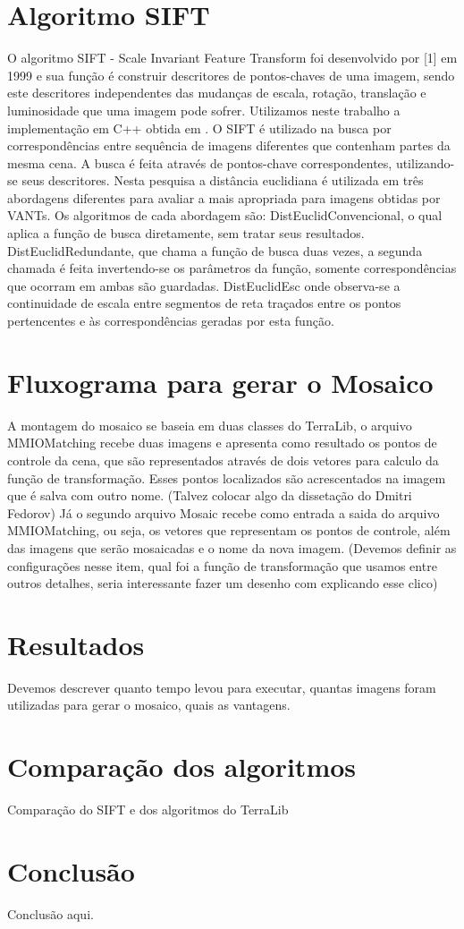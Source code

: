 \documentclass[9pt, a4paper, nofonttune, journal]{IEEEtran}
\begin{document}
\section{Algoritmo SIFT}

O algoritmo SIFT - Scale Invariant Feature Transform foi desenvolvido por [1] em 1999 e sua função é construir descritores de pontos-chaves de uma imagem,
 sendo este descritores independentes das mudanças de escala, rotação, translação e luminosidade que uma imagem pode sofrer.
Utilizamos neste trabalho a implementação em C++ obtida em \cite{Vedaldi}.
O SIFT é utilizado na busca por correspondências entre sequência de imagens diferentes que contenham partes da mesma cena. 
A busca é feita através de pontos-chave correspondentes, utilizando-se seus descritores. 
Nesta pesquisa a distância euclidiana é utilizada em três abordagens diferentes para avaliar a mais apropriada para imagens obtidas por VANTs. 
Os algoritmos de cada abordagem são: DistEuclidConvencional, o qual aplica a função de busca diretamente, sem tratar seus resultados. 
DistEuclidRedundante, que chama a função de busca duas vezes, a segunda chamada é feita invertendo-se os parâmetros da função, 
somente correspondências que ocorram em ambas são guardadas. 
DistEuclidEsc onde observa-se a continuidade de escala entre segmentos de reta traçados entre os pontos pertencentes e às correspondências geradas 
por esta função.

\section{ Fluxograma para gerar o Mosaico}
 A montagem do mosaico se baseia em duas classes do TerraLib, o arquivo MMIOMatching recebe duas imagens e apresenta como resultado os pontos de controle da cena, que são representados através de dois vetores para calculo da função de transformação. Esses pontos localizados são acrescentados na imagem que é salva com outro nome.
(Talvez colocar algo da dissetação do Dmitri Fedorov)
 Já o segundo arquivo  Mosaic recebe como entrada  a saida do  arquivo MMIOMatching, ou seja, os vetores  que representam os pontos de controle, além das imagens que serão mosaicadas e o nome da nova imagem.
(Devemos definir as configurações nesse item, qual foi a função de transformação que usamos entre outros detalhes, seria interessante fazer um desenho com explicando esse clico)

\section{Resultados}
Devemos descrever quanto tempo levou para executar, quantas imagens foram utilizadas para gerar o mosaico, quais as vantagens. 

\section{Comparação dos algoritmos}
Comparação do SIFT e dos algoritmos do TerraLib

\section{Conclusão}
Conclusão aqui.



\end{document}
